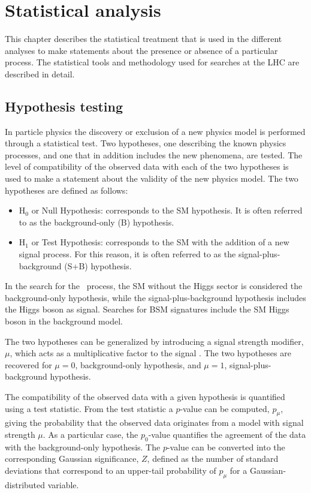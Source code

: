 \chapter{Statistical analysis}
\label{chapter:Statistics}

This chapter describes the statistical treatment that is used in the different analyses to make statements about the presence or absence of a particular process. The statistical tools and methodology used for searches at the LHC are described in detail.

\section{Hypothesis testing}
In particle physics the discovery or exclusion of a new physics model is performed through a statistical test. Two hypotheses, one describing the known physics processes, and one that in addition includes the new phenomena, are tested. The level of compatibility of the observed data with each of the two hypotheses is used to make a statement about the validity of the new physics model.
The two hypotheses are defined as follows:

    \begin{itemize}
    \item H$_0$ or Null Hypothesis: corresponds to the SM hypothesis.
      It is often referred to as the background-only (B) hypothesis.
    \item H$_1$ or Test Hypothesis: corresponds to the SM with the addition of a new signal process.
      For this reason, it is often referred to as the signal-plus-background (S+B) hypothesis.
    \end{itemize}
      In the search for the \ttH\ process, the SM without the Higgs sector is considered the background-only hypothesis, 
      while the signal-plus-background hypothesis includes the Higgs boson as signal. Searches for BSM signatures include the SM Higgs boson in the background model.

    The two hypotheses can be generalized by introducing a signal strength modifier, $\mu$, which acts as a multiplicative factor to the signal \xsec. The two hypotheses are recovered for $\mu = 0$, background-only hypothesis, and $\mu = 1$, signal-plus-background hypothesis.

    The compatibility of the observed data with a given hypothesis is quantified using a test statistic. From the test statistic a $p$-value can be computed, $p_\mu$, giving the probability that the observed data originates from a model with signal strength $\mu$. As a particular case, the $p_0$-value quantifies the agreement of the data with the background-only hypothesis.
    The $p$-value can be converted into the corresponding Gaussian significance, $Z$, defined as 
    the number of standard deviations that correspond to an upper-tail probability of $p_\mu$ for a Gaussian-distributed variable. 
    
